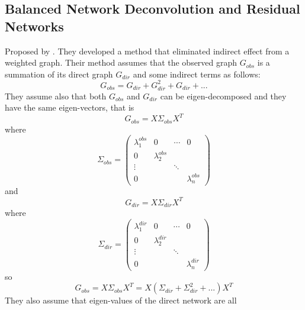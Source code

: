 \documentclass{article}
\begin{document}
\subsection{Balanced Network Deconvolution and Residual Networks}
Proposed by \cite{feizi2013network}. They developed a method that
eliminated indirect effect from a weighted graph. Their method
assumes that the observed graph $G_{obs}$ is a summation of its 
direct graph $G_{dir}$ and some indirect terms as follows:
\begin{equation}
    \label{indirect_effects}
    G_{obs} = G_{dir} + G_{dir}^2 + G_{dir} + ...
\end{equation}
They assume also that both $G_{obs}$ and $G_{dir}$ can be 
eigen-decomposed and they have the same eigen-vectors, that is
\begin{equation}
    G_{obs} = X \Sigma_{obs} X^T
\end{equation}
where 
\begin{equation}
    \Sigma_{obs} = 
    \begin{pmatrix}  
        \lambda^{obs}_1 &   0            & \cdots    &    0 \\
        0               &\lambda^{obs}_2 &           &      \\
        \vdots          &                & \ddots    &      \\
        0               &                &           & \lambda^{obs}_n
    \end{pmatrix}
\end{equation}
and
\begin{equation}
    G_{dir} = X \Sigma_{dir} X^T
\end{equation}
where
\begin{equation}
    \Sigma_{dir} = 
    \begin{pmatrix}  
        \lambda^{dir}_1 &   0            & \cdots    &    0 \\
        0               &\lambda^{dir}_2 &           &      \\
        \vdots          &                & \ddots    &      \\
        0               &                &           & \lambda^{dir}_n
    \end{pmatrix}
\end{equation}
so
\begin{equation}
    G_{obs} = X \Sigma_{obs} X^T = X ( \Sigma_{dir} + \Sigma_{dir}^2 + ...) X^T
\end{equation}
They also assume that eigen-values of the direct network are all
\end{document}
